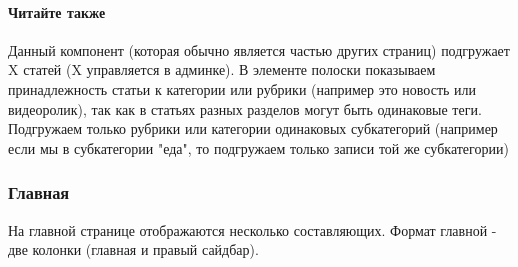 \documentclass[DIV=calc, paper=a4, fontsize=11pt]{scrartcl} %
\begin{document}
\paragraph{Читайте также}
Данный компонент (которая обычно является частью других страниц) подгружает X статей (X управляется в админке). В элементе полоски показываем принадлежность статьи к категории или рубрики (например это новость или видеоролик), так как в статьях разных разделов могут быть одинаковые теги. Подгружаем только рубрики или категории одинаковых субкатегорий (например если мы в субкатегории "еда", то подгружаем только записи той же субкатегории)

\subsubsection{Главная}
На главной странице отображаются несколько составляющих. Формат главной - две колонки (главная и правый сайдбар).
\end{document}
